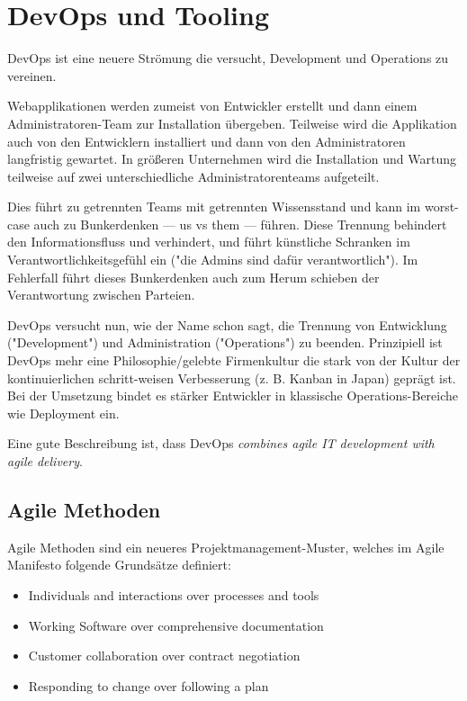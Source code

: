 \section{DevOps und Tooling}

DevOps ist eine neuere Strömung die versucht, Development und Operations zu vereinen.

Webapplikationen werden zumeist von Entwickler erstellt und dann einem Administratoren-Team zur Installation übergeben. Teilweise wird die Applikation auch von den Entwicklern installiert und dann von den Administratoren langfristig gewartet. In größeren Unternehmen wird die Installation und Wartung teilweise auf zwei unterschiedliche Administratorenteams aufgeteilt.

Dies führt zu getrennten Teams mit getrennten Wissensstand und kann im worst-case auch zu Bunkerdenken --- us vs them --- führen. Diese Trennung behindert den Informationsfluss und verhindert, und führt künstliche Schranken im Verantwortlichkeitsgefühl ein ("die Admins sind dafür verantwortlich"). Im Fehlerfall führt dieses Bunkerdenken auch zum Herum schieben der Verantwortung zwischen Parteien.

DevOps versucht nun, wie der Name schon sagt, die Trennung von Entwicklung ("Development") und Administration ("Operations") zu beenden. Prinzipiell ist DevOps mehr eine Philosophie/gelebte Firmenkultur die stark von der Kultur der kontinuierlichen schritt-weisen Verbesserung (z. B. Kanban in Japan) geprägt ist. Bei der Umsetzung bindet es stärker Entwickler in klassische Operations-Bereiche wie Deployment ein.

Eine gute Beschreibung ist, dass DevOps \textit{combines agile IT development with agile delivery}.

\subsection{Agile Methoden}

Agile Methoden sind ein neueres Projektmanagement-Muster, welches im Agile Manifesto folgende Grundsätze definiert:

\begin{itemize}
	\item Individuals and interactions over processes and tools
	\item Working Software over comprehensive documentation
	\item Customer collaboration over contract negotiation
	\item Responding to change over following a plan
\end{itemize}

